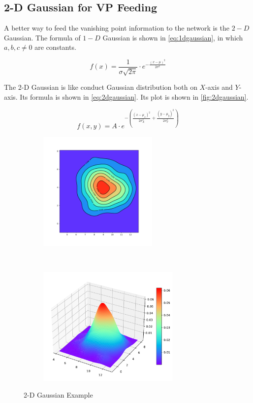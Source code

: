 \begin{spacing}{1.5}
\section{2-D Gaussian for VP Feeding}
\label{sec:MD_2D}

A better way to feed the vanishing point information to the network is the $2-D$ Gaussian. The formula of $1-D$ Gaussian is shown in \autoref{eq:1dgaussian}, in which $a,b,c \neq 0$ are constants.

\begin{equation}
\label{eq:1dgaussian}
    f(x)=\frac{1}{\sigma \sqrt{2 \pi }} \cdot e^{-\frac{(x- \mu )^2}{2 \sigma^2}}
\end{equation}

The 2-D Gaussian is like conduct Gaussian distribution both on $X$-axis and $Y$-axis. Its formula is shown in \autoref{eq:2dgaussian}. Its plot is shown in \autoref{fig:2dgaussian}.

\begin{equation}
\label{eq:2dgaussian}
    f(x,y)= A \cdot e^{-\left(\frac{(x- \mu_x )^2}{2 \sigma_{X}^{2}}+\frac{(y- \mu_y )^2}{2 \sigma_{Y}^{2}}\right)}
\end{equation}

\begin{figure}[!ht]
\begin{adjustbox}{minipage=0.98\linewidth,fbox}
    \centering
    \begin{subfigure}[b]{0.49\textwidth}
        \centering
        \includegraphics[height=2.3in]{Chapter3/gaussian2d.pdf}
    \end{subfigure}%
    ~
    \begin{subfigure}[b]{0.49\textwidth}
        \centering
        \includegraphics[height=2.3in]{Chapter3/gaussian3d.pdf}
    \end{subfigure}
\end{adjustbox}
\caption{2-D Gaussian Example}
\label{fig:2dgaussian}
\end{figure}


\end{spacing}
